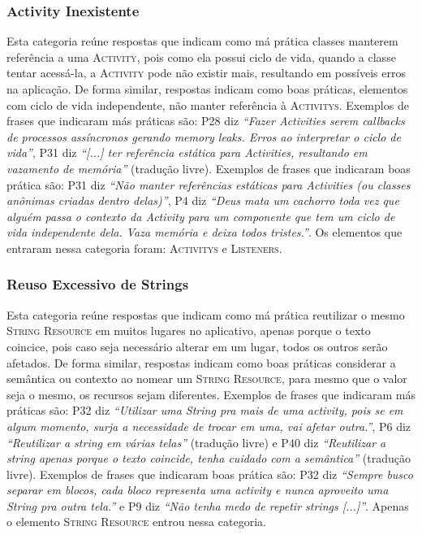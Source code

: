 \subsubsection{Activity Inexistente}
Esta categoria re\'une respostas que indicam como m\'a pr\'atica classes manterem refer\^encia a uma \textsc{Activity}, pois como ela possui ciclo de vida, quando a classe tentar acess\'a-la, a \textsc{Activity} pode n\~ao existir mais, resultando em poss\'iveis erros na aplica\c{c}\~ao. De forma similar, respostas indicam como boas pr\'aticas, elementos com ciclo de vida independente, n\~ao manter refer\^encia \`a \textsc{Activitys}. Exemplos de frases que indicaram m\'as pr\'aticas s\~ao: P28 diz \textit{``Fazer Activities serem callbacks de processos ass\'incronos gerando memory leaks. Erros ao interpretar o ciclo de vida''}, P31 diz \textit{``[...] ter refer\^encia est\'atica para Activities, resultando em vazamento de mem\'oria''} (tradu\c{c}\~ao livre). Exemplos de frases que indicaram boas pr\'atica s\~ao: P31 diz \textit{``N\~ao manter refer\^encias est\'aticas para Activities (ou classes an\^onimas criadas dentro delas)''}, P4 diz \textit{``Deus mata um cachorro toda vez que algu\'em passa o contexto da Activity para um componente que tem um ciclo de vida independente dela. Vaza mem\'oria e deixa todos tristes.''}. Os elementos que entraram nessa categoria foram: \textsc{Activitys} e \textsc{Listeners}. 


\subsubsection{Reuso Excessivo de Strings}
Esta categoria re\'une respostas que indicam como m\'a pr\'atica reutilizar o mesmo \textsc{String Resource} em muitos lugares no aplicativo, apenas porque o texto coincice, pois caso seja necess\'ario alterar em um lugar, todos os outros ser\~ao afetados. De forma similar, respostas indicam como boas pr\'aticas considerar a semântica ou contexto ao nomear um \textsc{String Resource}, para mesmo que o valor seja o mesmo, os recursos sejam diferentes. Exemplos de frases que indicaram m\'as pr\'aticas s\~ao: P32 diz \textit{``Utilizar uma String pra mais de uma activity, pois se em algum momento, surja a necessidade de trocar em uma, vai afetar outra.''}, P6 diz \textit{``Reutilizar a string em v\'arias telas''} (tradu\c{c}\~ao livre) e P40 diz \textit{``Reutilizar a string apenas porque o texto coincide, tenha cuidado com a semântica''} (tradu\c{c}\~ao livre). Exemplos de frases que indicaram boas pr\'atica s\~ao: P32 diz \textit{``Sempre busco separar em blocos, cada bloco representa uma activity e nunca aproveito uma String pra outra tela.''} e P9 diz \textit{``N\~ao tenha medo de repetir strings [...]''}. Apenas o elemento \textsc{String Resource} entrou nessa categoria. 



